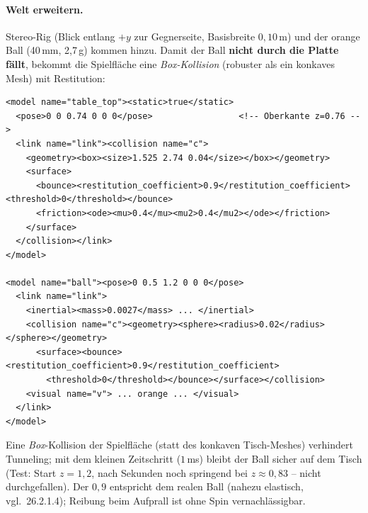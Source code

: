 \paragraph{Welt erweitern.} Stereo-Rig (Blick entlang $+y$ zur Gegnerseite,
Basisbreite $0{,}10\,$m) und der orange Ball (40\,mm, 2{,}7\,g) kommen hinzu.
Damit der Ball \textbf{nicht durch die Platte fällt}, bekommt die Spielfläche
eine \emph{Box-Kollision} (robuster als ein konkaves Mesh) mit Restitution:
\begin{lstlisting}[style=xml,caption={Spielflächen-Kollision + Ball (Auszug aus tabletennis.sdf)}]
<model name="table_top"><static>true</static>
  <pose>0 0 0.74 0 0 0</pose>                 <!-- Oberkante z=0.76 -->
  <link name="link"><collision name="c">
    <geometry><box><size>1.525 2.74 0.04</size></box></geometry>
    <surface>
      <bounce><restitution_coefficient>0.9</restitution_coefficient><threshold>0</threshold></bounce>
      <friction><ode><mu>0.4</mu><mu2>0.4</mu2></ode></friction>
    </surface>
  </collision></link>
</model>

<model name="ball"><pose>0 0.5 1.2 0 0 0</pose>
  <link name="link">
    <inertial><mass>0.0027</mass> ... </inertial>
    <collision name="c"><geometry><sphere><radius>0.02</radius></sphere></geometry>
      <surface><bounce><restitution_coefficient>0.9</restitution_coefficient>
        <threshold>0</threshold></bounce></surface></collision>
    <visual name="v"> ... orange ... </visual>
  </link>
</model>
\end{lstlisting}
\begin{infobox}[title={Aufprall: kein Durchfallen, fast elastischer Stoß}]
Eine \emph{Box}-Kollision der Spielfläche (statt des konkaven Tisch-Meshes)
verhindert Tunneling; mit dem kleinen Zeitschritt ($1\,$ms) bleibt der Ball
sicher auf dem Tisch (Test: Start $z=1{,}2$, nach Sekunden noch springend bei
$z\approx0{,}83$ -- nicht durchgefallen). Der 
$0{,}9$ entspricht dem realen Ball (nahezu elastisch, vgl.\ 26.2.1.4); Reibung
beim Aufprall ist ohne Spin vernachlässigbar.
\end{infobox}


